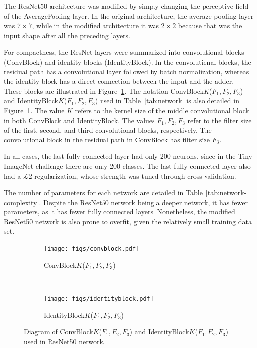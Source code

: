 \documentclass[10pt,twocolumn,letterpaper]{article}
\begin{document}
The ResNet50 architecture was modified by simply changing the perceptive field of the AveragePooling layer. In the original architecture, the average pooling layer was $7\times 7$, while in the modified architecture it was $2 \times 2$ because that was the input shape after all the preceding layers. 

For compactness, the ResNet layers were summarized into convolutional blocks (ConvBlock) and identity blocks (IdentityBlock). In the convolutional blocks, the residual path has a convolutional layer followed by batch normalization, whereas the identity block has a direct connection between the input and the adder. These blocks are illustrated in Figure~\ref{fig:conv-id-block}. The notation ConvBlock$K$($F_1, F_2, F_3$) and IdentityBlock$K$($F_1, F_2, F_3$) used in Table~\ref{tab:network} is also detailed in Figure~\ref{fig:conv-id-block}. The value $K$ refers to the kernel size of the middle convolutional block in both ConvBlock and IdentityBlock. The values $F_1, F_2, F_3$ refer to the filter size of the first, second, and third convolutional blocks, respectively. The convolutional block in the residual path in ConvBlock has filter size $F_3$.

In all cases, the last fully connected layer had only 200 neurons, since in the Tiny ImageNet challenge there are only 200 classes. The last fully connected layer also had a $\mathcal{L}2$ regularization, whose strength was tuned through cross validation.

The number of parameters for each network are detailed in Table~\ref{tab:network-complexity}. Despite the ResNet50 network being a deeper network, it has fewer parameters, as it has fewer fully connected layers. Nonetheless, the modified ResNet50 network is also prone to overfit, given the relatively small training data set. 

\begin{figure}[t]
	\centering
	\begin{subfigure}[h!]{0.25\textwidth}
		\texttt{[image: figs/convblock.pdf]}
		\caption{ConvBlock$K$($F_1, F_2, F_3$)}
	\end{subfigure}%
	~ %
	\begin{subfigure}[h!]{0.25\textwidth}
		\texttt{[image: figs/identityblock.pdf]}
		\caption{IdentityBlock$K$($F_1, F_2, F_3$)}
	\end{subfigure}
	\caption{Diagram of ConvBlock$K$($F_1, F_2, F_3$) and IdentityBlock$K$($F_1, F_2, F_3$) used in ResNet50 network.}\label{fig:conv-id-block}
\end{figure}
\end{document}
